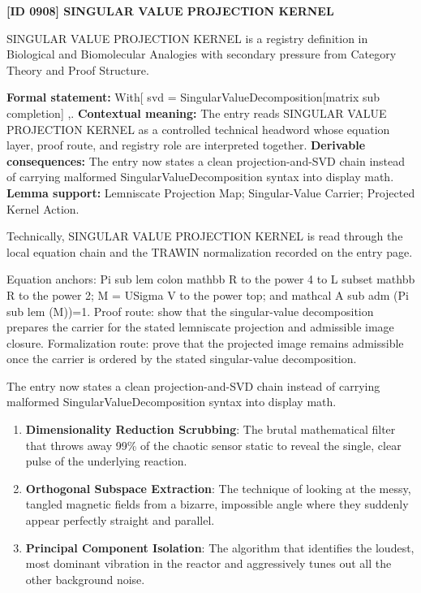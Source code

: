 \clearpage
\noindent\textbf{[ID 0908] SINGULAR VALUE PROJECTION KERNEL}\par
\vspace{0.35em}
\begingroup\small
{}
SINGULAR VALUE PROJECTION KERNEL is a registry definition in Biological and Biomolecular Analogies with secondary pressure from Category Theory and Proof Structure.

\begingroup\footnotesize\setlength{\emergencystretch}{3em}\sloppy
\textbf{Formal statement:} With[ svd = SingularValueDecomposition[matrix sub completion] ,. \textbf{Contextual meaning:} The entry reads SINGULAR VALUE PROJECTION KERNEL as a controlled technical headword whose equation layer, proof route, and registry role are interpreted together. \textbf{Derivable consequences:} The entry now states a clean projection-and-SVD chain instead of carrying malformed SingularValueDecomposition syntax into display math. \textbf{Lemma support:} Lemniscate Projection Map; Singular-Value Carrier; Projected Kernel Action.\par
\endgroup

Technically, SINGULAR VALUE PROJECTION KERNEL is read through the local equation chain and the TRAWIN normalization recorded on the entry page.

Equation anchors: Pi sub lem colon mathbb R to the power 4 to L subset mathbb R to the power 2; M = USigma V to the power top; and mathcal A sub adm (Pi sub lem (M))=1. Proof route: show that the singular-value decomposition prepares the carrier for the stated lemniscate projection and admissible image closure. Formalization route: prove that the projected image remains admissible once the carrier is ordered by the stated singular-value decomposition.

The entry now states a clean projection-and-SVD chain instead of carrying malformed SingularValueDecomposition syntax into display math.
\endgroup

\begin{enumerate}[leftmargin=1.6em,itemsep=6pt,topsep=4pt]
\item \textbf{Dimensionality Reduction Scrubbing}: The brutal mathematical filter that throws away 99\% of the chaotic sensor static to reveal the single, clear pulse of the underlying reaction.
\item \textbf{Orthogonal Subspace Extraction}: The technique of looking at the messy, tangled magnetic fields from a bizarre, impossible angle where they suddenly appear perfectly straight and parallel.
\item \textbf{Principal Component Isolation}: The algorithm that identifies the loudest, most dominant vibration in the reactor and aggressively tunes out all the other background noise.
\end{enumerate}

